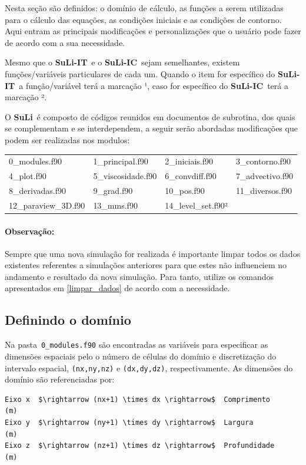 \documentclass[12pt, a4paper]{article}
\newcommand{\SL}{{\bf SuLi}}
\newcommand{\SLIT}{{\bf SuLi-IT}}
\newcommand{\SLIC}{{\bf SuLi-IC}}
\begin{document}
Nesta seção são definidos: o domínio de cálculo, as funções a serem utilizadas para o cálculo das equações, as condições iniciais e as condições de contorno. Aqui entram as principais modificações e personalizações que o usuário pode fazer de acordo com a sua necessidade.

Mesmo que o \SLIT\ e o \SLIC\ sejam semelhantes, existem funções/variáveis particulares de cada um. Quando o item for específico do \SLIT\ a função/variável terá a marcação ¹, caso for específico do \SLIC\ terá a marcação ².

O \SL\ é composto de códigos reunidos em documentos de subrotina, dos quais se complementam e se interdependem, a seguir serão abordadas modificações que podem ser realizadas nos modulos:

\begin{table}[htb]
	\begin{center}
		\begin{tabular}{llll}
		0\_modules.f90 & 1\_principal.f90 & 2\_iniciais.f90 & 3\_contorno.f90 \\
		4\_plot.f90  & 5\_viscosidade.f90 & 6\_convdiff.f90 & 7\_advectivo.f90 \\
		8\_derivadas.f90 & 9\_grad.f90 & 10\_pos.f90 & 11\_diversos.f90 \\
		12\_paraview\_3D.f90 & 13\_mms.f90 & 14\_level\_set.f90² & \\
		\end{tabular}		
	\end{center}
\end{table}

\paragraph{Observação:} Sempre que uma nova simulação for realizada é importante limpar todos os dados existentes referentes a simulações anteriores para que estes não influenciem no andamento e resultado da nova simulação. Para tanto, utilize os comandos apresentados em \ref{limpar_dados} de acordo com a necessidade.


\subsection{Definindo o domínio}

Na pasta \,\verb|0_modules.f90| são encontradas as variáveis para especificar as dimensões espaciais pelo o número de células do domínio e discretização do intervalo espacial, \verb|(nx,ny,nz)| e \verb|(dx,dy,dz)|, respectivamente. As dimensões do domínio são referenciadas por:
\begin{lstlisting}
Eixo x	$\rightarrow (nx+1) \times dx \rightarrow$  Comprimento		(m)
Eixo y  $\rightarrow (ny+1) \times dy \rightarrow$  Largura			  (m)
Eixo z	$\rightarrow (nz+1) \times dz \rightarrow$  Profundidade	(m)
\end{lstlisting}	\label{eixos}
\end{document}

